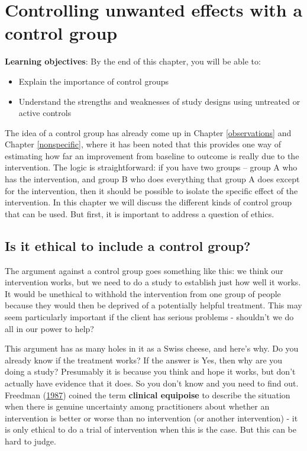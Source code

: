 \documentclass{krantz}
\begin{document}
\hypertarget{controls}{%
\chapter{Controlling unwanted effects with a control group}\label{controls}}

\textbf{Learning objectives}: By the end of this chapter, you will be able to:

\begin{itemize}
\item
  Explain the importance of control groups
\item
  Understand the strengths and weaknesses of study designs using untreated or active controls
\end{itemize}

The idea of a control group has already come up in Chapter \ref{observations} and Chapter \ref{nonspecific}, where it has been noted that this provides one way of estimating how far an improvement from baseline to outcome is really due to the intervention. The logic is straightforward: if you have two groups -- group A who has the intervention, and group B who does everything that group A does except for the intervention, then it should be possible to isolate the specific effect of the intervention. In this chapter we will discuss the different kinds of control group that can be used. But first, it is important to address a question of ethics.

\hypertarget{is-it-ethical-to-include-a-control-group}{%
\section{Is it ethical to include a control group?}\label{is-it-ethical-to-include-a-control-group}}

The argument against a control group goes something like this: we think our intervention works, but we need to do a study to establish just how well it works. It would be unethical to withhold the intervention from one group of people because they would then be deprived of a potentially helpful treatment. This may seem particularly important if the client has serious problems - shouldn't we do all in our power to help?

This argument has as many holes in it as a Swiss cheese, and here's why. Do you already know if the treatment works? If the answer is Yes, then why are you doing a study? Presumably it is because you think and hope it works, but don't actually have evidence that it does. So you don't know and you need to find out. Freedman (\protect\hyperlink{ref-freedman1987}{1987}) coined the term \textbf{clinical equipoise} to describe the situation when there is genuine uncertainty among practitioners about whether an intervention is better or worse than no intervention (or another intervention) - it is only ethical to do a trial of intervention when this is the case. But this can be hard to judge.
\end{document}
